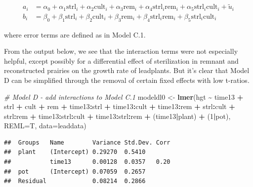 \documentclass[
]{krantz}
\newenvironment{Shaded}{\begin{snugshade}}{\end{snugshade}}
\newcommand{\AttributeTok}[1]{\textcolor[rgb]{0.27,0.27,0.27}{#1}}
\newcommand{\CommentTok}[1]{\textcolor[rgb]{0.37,0.37,0.37}{\textit{#1}}}
\newcommand{\DecValTok}[1]{\textcolor[rgb]{0.06,0.06,0.06}{#1}}
\newcommand{\FunctionTok}[1]{\textcolor[rgb]{0.27,0.27,0.27}{\textbf{#1}}}
\newcommand{\NormalTok}[1]{#1}
\newcommand{\OtherTok}[1]{\textcolor[rgb]{0.37,0.37,0.37}{#1}}
\newcommand{\SpecialCharTok}[1]{\textcolor[rgb]{0.43,0.43,0.43}{\textbf{#1}}}
\begin{document}
\begin{align*}
a_{i} & = \alpha_{0} + \alpha_{1}\textrm{strl}_{i} + \alpha_{2}\textrm{cult}_{i} + \alpha_{3}\textrm{rem}_{i} + \alpha_{4}\textrm{strl}_{i}\textrm{rem}_{i} + \alpha_{5}\textrm{strl}_{i}\textrm{cult}_{i} + \tilde{u}_{i} \\
b_{i} & = \beta_{0}+\beta_{1}\textrm{strl}_{i}+\beta_{2}\textrm{cult}_{i}+\beta_{3}\textrm{rem}_{i} + \beta_{4}\textrm{strl}_{i}\textrm{rem}_{i} + \beta_{5}\textrm{strl}_{i}\textrm{cult}_{i}
\end{align*}

where error terms are defined as in Model C.1.

From the output below, we see that the interaction terms were not especially helpful, except possibly for a differential effect of sterilization in remnant and reconstructed prairies on the growth rate of leadplants. But it's clear that Model D can be simplified through the removal of certain fixed effects with low t-ratios.

\begin{Shaded}
\begin{Highlighting}[]
\CommentTok{\# Model D {-} add interactions to Model C.1}
\NormalTok{modeldl0 }\OtherTok{\textless{}{-}} \FunctionTok{lmer}\NormalTok{(hgt }\SpecialCharTok{\textasciitilde{}}\NormalTok{ time13 }\SpecialCharTok{+}\NormalTok{ strl }\SpecialCharTok{+}\NormalTok{ cult }\SpecialCharTok{+}\NormalTok{ rem }\SpecialCharTok{+} 
\NormalTok{  time13}\SpecialCharTok{:}\NormalTok{strl }\SpecialCharTok{+}\NormalTok{ time13}\SpecialCharTok{:}\NormalTok{cult }\SpecialCharTok{+}\NormalTok{ time13}\SpecialCharTok{:}\NormalTok{rem }\SpecialCharTok{+}\NormalTok{ strl}\SpecialCharTok{:}\NormalTok{cult }\SpecialCharTok{+} 
\NormalTok{  strl}\SpecialCharTok{:}\NormalTok{rem }\SpecialCharTok{+}\NormalTok{ time13}\SpecialCharTok{:}\NormalTok{strl}\SpecialCharTok{:}\NormalTok{cult }\SpecialCharTok{+}\NormalTok{ time13}\SpecialCharTok{:}\NormalTok{strl}\SpecialCharTok{:}\NormalTok{rem }\SpecialCharTok{+}
\NormalTok{  (time13}\SpecialCharTok{|}\NormalTok{plant) }\SpecialCharTok{+}\NormalTok{ (}\DecValTok{1}\SpecialCharTok{|}\NormalTok{pot), }\AttributeTok{REML=}\NormalTok{T, }\AttributeTok{data=}\NormalTok{leaddata)}
\end{Highlighting}
\end{Shaded}

\begin{verbatim}
##  Groups   Name        Variance Std.Dev. Corr
##  plant    (Intercept) 0.29270  0.5410       
##           time13      0.00128  0.0357   0.20
##  pot      (Intercept) 0.07059  0.2657       
##  Residual             0.08214  0.2866
\end{verbatim}
\end{document}
